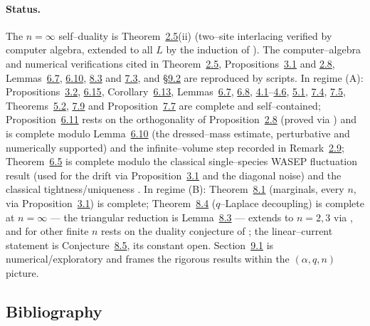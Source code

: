 \documentclass[11pt]{article}
\theoremstyle{plain}
\theoremstyle{definition}
\theoremstyle{remark}
\begin{document}
\paragraph{Status.} The $n=\infty$ self--duality is Theorem~\hyperref[thm_dual]{2.5}(ii)
(two--site interlacing verified by computer algebra, extended to all $L$ by the
induction of \cite{REU}). The computer--algebra and numerical verifications cited in
Theorem~\hyperref[thm_dual]{2.5}, Propositions~\hyperref[prop_decouple]{3.1} and \hyperref[prop_orth]{2.8},
Lemmas~\hyperref[lem_orth]{6.7}, \hyperref[lem_eps]{6.10}, \hyperref[lem_tridual]{8.3} and \hyperref[lem_crossbridge]{7.3}, and
\S\hyperref[sec_numerics]{9.2} are reproduced by scripts. In regime (A): Propositions~\hyperref[prop_cross]{3.2},
\hyperref[prop_drift]{6.15}, Corollary~\hyperref[prop_sym]{6.13}, Lemmas~\hyperref[lem_orth]{6.7}, \hyperref[lem_eqvar]{6.8},
\hyperref[lem_free]{4.1}--\hyperref[lem_tau]{4.6}, \hyperref[lem_asep]{5.1}, \hyperref[lem_split]{7.4}, \hyperref[lem_rebind]{7.5},
Theorems~\hyperref[thm_kernel]{5.2}, \hyperref[thm_closed]{7.9} and Proposition~\hyperref[prop_twophase]{7.7} are
complete and self--contained; Proposition~\hyperref[prop_conc]{6.11} rests on the orthogonality
of Proposition~\hyperref[prop_orth]{2.8} (proved via \cite{CFG20}) and is complete modulo
Lemma~\hyperref[lem_eps]{6.10} (the dressed--mass estimate, perturbative and numerically
supported) and the infinite--volume step recorded in Remark~\hyperref[rem_orthstatus]{2.9}; Theorem~\hyperref[thm_ewmain]{6.5} is complete modulo the classical
single--species WASEP fluctuation result (used for the drift via
Proposition~\hyperref[prop_decouple]{3.1} and the diagonal noise) and the classical
tightness/uniqueness \cite{KL}. In regime
(B): Theorem~\hyperref[thm_marg]{8.1} (marginals, every $n$, via
Proposition~\hyperref[prop_decouple]{3.1}) is complete; Theorem~\hyperref[thm_cov]{8.4} ($q$--Laplace
decoupling) is complete at $n=\infty$ --- the triangular reduction is
Lemma~\hyperref[lem_tridual]{8.3} --- extends to $n=2,3$ via \cite{REU}, and for other finite
$n$ rests on the duality conjecture of \cite[Rmk.~4]{REU}; the linear--current
statement is Conjecture~\hyperref[conj_cov]{8.5}, its constant open. Section~\hyperref[sec_phase]{9.1} is numerical/exploratory and frames the rigorous
results within the $(\alpha,q,n)$ picture.


\subsection{Bibliography}
\end{document}

